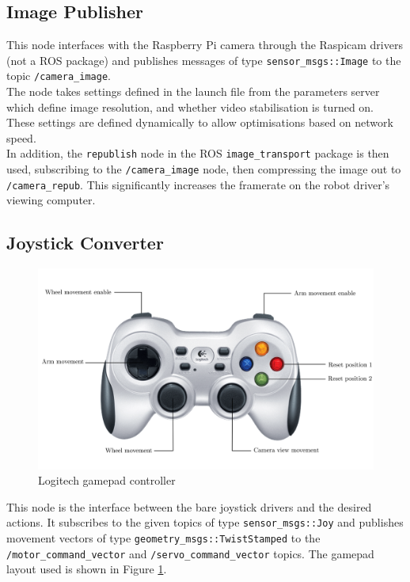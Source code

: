 \documentclass[titlepage,12pt,a4paper]{article}
\begin{document}
\subsection{Image Publisher}
This node interfaces with the Raspberry Pi camera through the Raspicam drivers (not a ROS package) and publishes messages of type \texttt{sensor\_msgs::Image} to the topic \texttt{/camera\_image}.\\

\noindent The node takes settings defined in the launch file from the parameters server which define image resolution, and whether video stabilisation is turned on. These settings are defined dynamically to allow optimisations based on network speed.\\

\noindent In addition, the \texttt{republish} node in the ROS \texttt{image\_transport} package is then used, subscribing to the \texttt{/camera\_image} node, then compressing the image out to \texttt{/camera\_repub}. This significantly increases the framerate on the robot driver's viewing computer.

\newpage
\subsection{Joystick Converter}

\begin{figure}
  \centering
      \includegraphics[width=\textwidth]{gamepadedit}
  \caption{Logitech gamepad controller}
  \label{fig:gamepad}
\end{figure}


This node is the interface between the bare joystick drivers and the desired actions. It subscribes to the given topics of type \texttt{sensor\_msgs::Joy} and publishes movement vectors of type \texttt{geometry\_msgs::TwistStamped} to the \texttt{/motor\_command\_vector} and \texttt{/servo\_command\_vector} topics. The gamepad layout used is shown in Figure \ref{fig:gamepad}. \\
\end{document}

